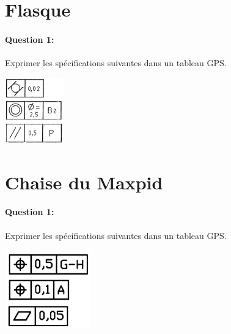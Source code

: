 

\section{Flasque}

\begin{minipage}{0.5\linewidth}

\paragraph{Question 1:} Exprimer les spécifications suivantes dans un tableau GPS.
\end{minipage}
\hfill
\begin{minipage}{0.45\linewidth}
\begin{center}
 \includegraphics[width=0.4\linewidth]{img/exo1.png}
\end{center}
\end{minipage}

\newpage




\newpage

\section{Chaise du Maxpid}

\begin{minipage}{0.5\linewidth}

\paragraph{Question 1:} Exprimer les spécifications suivantes dans un tableau GPS.
\end{minipage}
\hfill
\begin{minipage}{0.45\linewidth}
\begin{center}
 \includegraphics[width=0.4\linewidth]{img/exo2.png}
\end{center}
\end{minipage}

